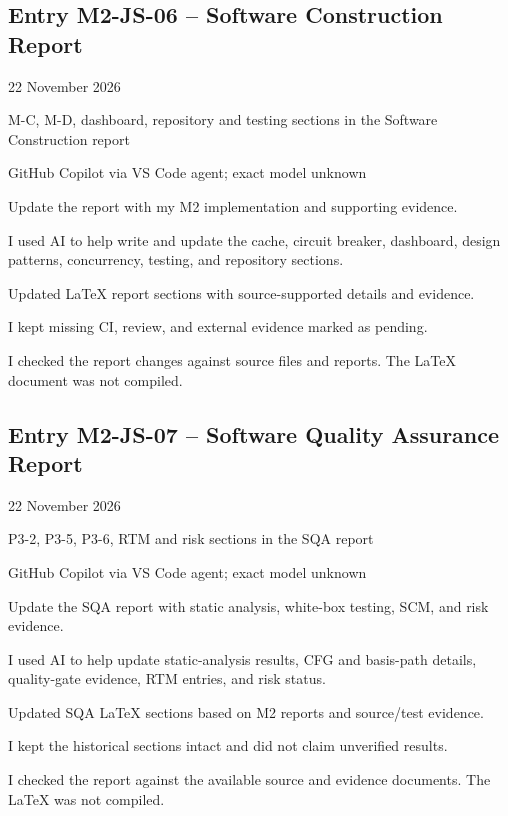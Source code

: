 \documentclass[11pt,a4paper]{article}
\newcommand{\ailogentry}[9]{
\subsection*{#1}
\begin{description}[leftmargin=3.2cm,style=nextline,font=\bfseries]
\item[Date] #2
\item[Module] #3
\item[AI Tool] #4
\item[Purpose] #5
\item[Activity] #6
\item[Used] #7
\item[Changes] #8
\item[Verification] #9
\end{description}
}
\begin{document}
\ailogentry
{Entry M2-JS-06 -- Software Construction Report}
{22 November 2026}
{M-C, M-D, dashboard, repository and testing sections in the Software Construction report}
{GitHub Copilot via VS Code agent; exact model unknown}
{Update the report with my M2 implementation and supporting evidence.}
{I used AI to help write and update the cache, circuit breaker, dashboard, design patterns, concurrency, testing, and repository sections.}
{Updated LaTeX report sections with source-supported details and evidence.}
{I kept missing CI, review, and external evidence marked as pending.}
{I checked the report changes against source files and reports. The LaTeX document was not compiled.}

\ailogentry
{Entry M2-JS-07 -- Software Quality Assurance Report}
{22 November 2026}
{P3-2, P3-5, P3-6, RTM and risk sections in the SQA report}
{GitHub Copilot via VS Code agent; exact model unknown}
{Update the SQA report with static analysis, white-box testing, SCM, and risk evidence.}
{I used AI to help update static-analysis results, CFG and basis-path details, quality-gate evidence, RTM entries, and risk status.}
{Updated SQA LaTeX sections based on M2 reports and source/test evidence.}
{I kept the historical sections intact and did not claim unverified results.}
{I checked the report against the available source and evidence documents. The LaTeX was not compiled.}
\end{document}
